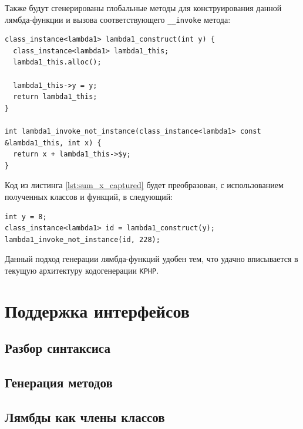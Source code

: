 Также будут сгенерированы глобальные методы для конструирования данной лямбда-функции и вызова соответствующего \verb|__invoke| метода:
\begin{lstlisting}
class_instance<lambda1> lambda1_construct(int y) {
  class_instance<lambda1> lambda1_this;
  lambda1_this.alloc();

  lambda1_this->y = y;
  return lambda1_this;
}

int lambda1_invoke_not_instance(class_instance<lambda1> const &lambda1_this, int x) {
  return x + lambda1_this->$y;
}
\end{lstlisting}

Код из листинга \ref{lst:sum_x_captured} будет преобразован, с использованием полученных классов и функций, в следующий:
\begin{lstlisting}
int y = 8;
class_instance<lambda1> id = lambda1_construct(y);
lambda1_invoke_not_instance(id, 228);
\end{lstlisting}

Данный подход генерации лямбда-функций удобен тем, что удачно вписывается в текущую архитектуру кодогенерации \verb|KPHP|.

\section{Поддержка интерфейсов}
\subsection{Разбор синтаксиса}
\subsection{Генерация методов}
\subsection{Лямбды как члены классов}

\chapterconclusion
